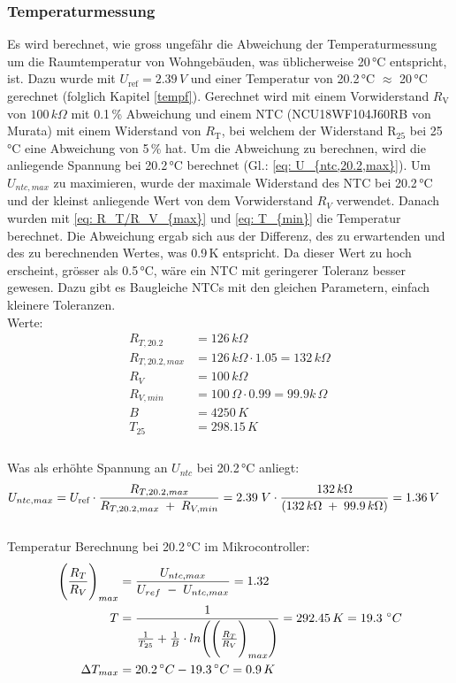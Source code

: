 \subsubsection{Temperaturmessung}
Es wird berechnet, wie gross ungefähr die Abweichung der Temperaturmessung um die Raumtemperatur von Wohngebäuden, was üblicherweise 20\,°C entspricht, ist. Dazu wurde mit $U_\text{ref} = 2.39\,V$ und einer Temperatur von 20.2\,°C $\approx$ 20\,°C  gerechnet (folglich Kapitel \ref{tempf}). Gerechnet wird mit einem Vorwiderstand $R_{\text{V}}$ von $100\,k\Omega$ mit 0.1\,\% Abweichung und einem NTC (NCU18WF104J60RB von Murata) mit einem Widerstand von $R_{\text{T}}$, bei welchem der Widerstand R$_{25}$ bei 25\,°C eine Abweichung von 5\,\% hat. Um die Abweichung zu berechnen, wird die anliegende Spannung bei 20.2\,°C berechnet (Gl.: \ref{eq: U_{ntc,20.2,max}}). Um $U_{ntc,max}$ zu maximieren, wurde der maximale Widerstand des NTC bei 20.2\,°C und der kleinst anliegende Wert von dem Vorwiderstand $R_V$ verwendet. Danach wurden mit \ref{eq: R_T/R_V_{max}} und \ref{eq: T_{min}} die Temperatur berechnet. Die Abweichung ergab sich aus der Differenz, des zu erwartenden und des zu berechnenden Wertes, was 0.9\,K entspricht. Da dieser Wert zu hoch erscheint, grösser als 0.5\,°C, wäre ein NTC mit geringerer Toleranz besser gewesen. Dazu gibt es Baugleiche NTCs mit den gleichen Parametern, einfach kleinere Toleranzen.
\\
Werte:
\begin{align*}
R_{T,20.2} &= 126\,k\Omega\\
R_{T,20.2,max} &= 126\,k\Omega \cdot 1.05 = 132\,k\Omega\\
R_V &= 100\,k\Omega\\
R_{V,min} &= 100\,\Omega \cdot 0.99 = 99.9k\,\Omega\\
B &= 4250\,K\\
T_{25} &= 298.15\,K\\
\end{align*}
\\
Was als erhöhte Spannung an $U_{ntc}$ bei 20.2\,°C anliegt:
\begin{align}
U_{ntc,max} &= U_{\text{ref}} \cdot \frac{R_{T,20.2,max}}{R_{T,20.2,max}\;+\;R_{V,min}} = 2.39\;V \cdot \frac{ 132\,k\Omega}{(132\,k\Omega\;+\;99.9\,k\Omega)} = 1.36\,V\label{eq: U_{ntc,20.2,max}}
\end{align}
\\
Temperatur Berechnung bei 20.2\,°C im Mikrocontroller:
\begin{align}
\Biggl( \frac{R_T}{R_V}\Biggr)_{max} &= \frac{U_{ntc,max}}{U_{ref}\;-\;U_{ntc,max}} = 1.32 \label{eq: R_T/R_V_{max}}\\
T &= \frac{1}{\frac{1}{T_{25}}+\frac{1}{B} \cdot ln\Biggl( \Biggl( \frac{R_T}{R_V}\Biggr)_{max}\Biggr)} = 292.45\,K = 19.3\,\,^\circ C \label{eq: T_{min}}\\
\Delta T_{max} &= 20.2\,^\circ C - 19.3\,^\circ C = 0.9\,K \label{dT_{max}}
\end{align}

